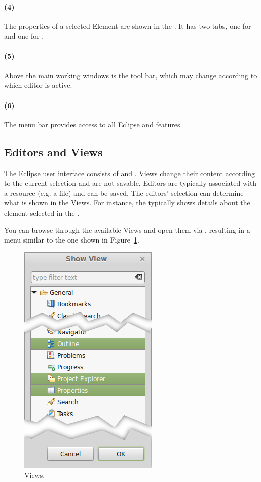 \paragraph{(4)} The properties of a selected Element are shown in the .  It has two tabs, one for  and one for .

\paragraph{(5)} Above the main working windows is the tool bar, which may change according to which editor is active.

\paragraph{(6)} The menu bar provides access to all Eclipse and \pror{} features.

\subsection{Editors and Views}

The Eclipse user interface consists of  and .  Views change their content according to the current selection and are not savable.  Editors are typically associated with a resource (e.g. a file) and can be saved.  The editors' selection can determine what is shown in the Views.  For instance, the  typically shows details about the element selected in the .

You can browse through the available Views and open them via , resulting in a menu similar to the one shown in Figure~\ref{fig:Views}.

\begin{figure}
\centering
\includegraphics[width=.3\textwidth]{../rmf-images/views_highlighted.png}
\caption{Views.}
\label{fig:Views}
\end{figure}

